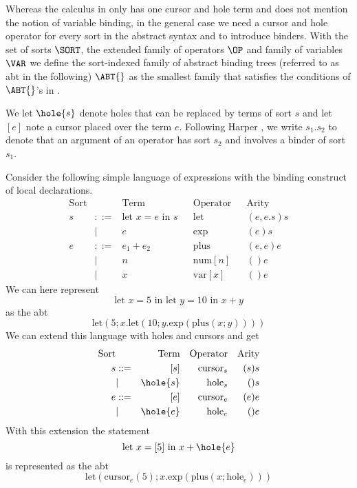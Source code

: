 \documentclass[sigplan,review]{acmart}
\newcommand{\abt}{\textsf{abt}\xspace}
\begin{document}
Whereas the calculus in \cite{type_safe_structure_editor} only has one
cursor and hole term and does not mention the notion of variable
binding, in the general case we need a cursor and hole operator for
every sort in the abstract syntax and to introduce binders.  With the
set of sorts $\SORT$, the extended family of operators $\OP$ and
family of variables $\VAR$ we define the sort-indexed family of
abstract binding trees (referred to as \abt in the following) $\ABT{}$
as the smallest family that satisfies the conditions of $\ABT{}$'s in
\cite{harper_foundations}.

We let $\hole{s}$ denote holes that can be replaced by terms of sort
$s$ and let $[e]$ note a cursor placed over the term $e$. Following
Harper \cite{harper_foundations}, we write $s_1.s_2$ to denote that an
argument of an operator has sort $s_2$ and involves a binder of sort
$s_1$.

\begin{example}\label{ex:abstract_syntax}
Consider the following simple language of expressions with the binding
construct of local declarations.
\begin{align*}
  \text{Sort} && \text{Term} && \text{Operator} && \text{Arity} \\
        s & ::= & \text{let $x = e$ in $s$} && \text{let} && (e, e.s)s \\
        & | & e && \text{exp} && (e)s \\
  e & ::= & e_1 + e_2 && \text{plus} && (e,e)e \\
        & | & n && \text{num}[n] &&  ()e \\
        & | & x && \text{var}[x] && ()e
\end{align*}
 We can here represent
    \begin{equation*}
        \text{let $x=5$ in let $y=10$ in $x+y$}
    \end{equation*}
    as the \abt
    \begin{equation*}
        \text{let}(5;x.\text{let}(10;y.\text{exp}(\text{plus}(x;y))))
    \end{equation*}
%
    We can extend this language with holes and cursors and get
\begin{align*}
        \text{Sort} && \text{Term} && \text{Operator} && \text{Arity} \\
        s & ::= & [s] && \text{cursor}_s && (s)s \\
        & | & \hole{s} && \text{hole}_s && ()s \\
        e & ::= & [e] && \text{cursor}_e && (e)e \\
        & | & \hole{e} && \text{hole}_e && ()e
 \end{align*}
%
    With this extension the statement
    \begin{equation*}
        \text{let $x=[5]$ in $x+\hole{e}$}
    \end{equation*}
    is represented as the \abt
    \begin{equation*}
        \text{let}(\text{cursor}_e(5); x.\text{exp}(\text{plus}(x;\text{hole}_e)))
    \end{equation*}
\end{example}
\end{document}
